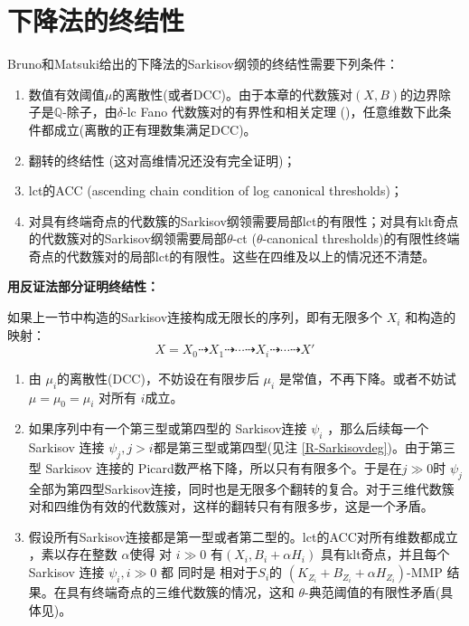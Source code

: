 \section{下降法的终结性}\label{termination1}
Bruno和Matsuki给出的下降法的Sarkisov纲领的终结性需要下列条件：
\begin{enumerate}
  \item 数值有效阈值$\mu$的离散性(或者DCC)。由于本章的代数簇对$(X,B)$的边界除子是$\mathbb{Q}$-除子，由$\delta$-lc Fano 代数簇对的有界性和相关定理 (\cite[Theorem 1.1]{birkarSingularitiesLinearSystems2020})，任意维数下此条件都成立(离散的正有理数集满足DCC)。
  \item 翻转的终结性 (这对高维情况还没有完全证明)； 
  \item lct的ACC (ascending chain condition of log canonical thresholds)；
  \item 对具有终端奇点的代数簇的Sarkisov纲领需要局部lct的有限性；对具有klt奇点的代数簇对的Sarkisov纲领需要局部$\theta$-ct ($\theta$-canonical thresholds)的有限性终端奇点的代数簇对的局部lct的有限性。这些在四维及以上的情况还不清楚。
\end{enumerate}
\textbf{用反证法部分证明终结性： }

如果上一节中构造的Sarkisov连接构成无限长的序列，即有无限多个 $ X_i $ 和构造的映射：
\[ X=X_0\dashrightarrow X_1\dashrightarrow \cdots\dashrightarrow X_i \dashrightarrow\cdots\dashrightarrow X'\]
\begin{enumerate}
  \item 由 $\mu_{i}$的离散性(DCC)，不妨设在有限步后 $\mu_{i}$ 是常值，不再下降。或者不妨试 $\mu=\mu_{0}=\mu_{i}$ 对所有 $i$成立。
  \item 如果序列中有一个第三型或第四型的 Sarkisov连接 $\psi_i$ ，那么后续每一个 Sarkisov 连接 $\psi_j, j>i$都是第三型或第四型(见注 \ref{R-Sarkisovdeg})。由于第三型 Sarkisov 连接的 Picard数严格下降，所以只有有限多个。于是在$j\gg 0$时 $\psi_j$ 全部为第四型Sarkisov连接，同时也是无限多个翻转的复合。对于三维代数簇对和四维伪有效的代数簇对，这样的翻转只有有限多步，这是一个矛盾。
  \item 假设所有Sarkisov连接都是第一型或者第二型的。lct的ACC对所有维数都成立 \cite{HMX14}，素以存在整数 $\alpha$使得 对 $i\gg 0$ 有$(X_i,B_i+\alpha H_i)$ 具有klt奇点，并且每个Sarkisov 连接 $\psi_i,i\gg 0$ 都 同时是 相对于$S_{i}$的  $(K_{Z_i}+B_{Z_i}+\alpha H_{Z_i})$-MMP 结果。在具有终端奇点的三维代数簇的情况，这和 $\theta$-典范阈值的有限性矛盾(具体见\cite[Claim 2.2]{brunoLogSarkisovProgram1995})。
\end{enumerate}

